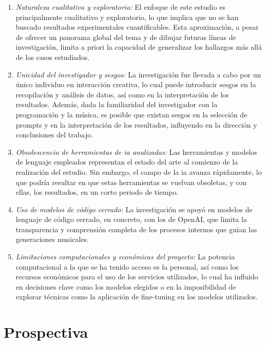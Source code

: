 \begin{enumerate}
    
\item \textit{Naturaleza cualitativa y exploratoria:} El enfoque de este estudio es principalmente cualitativo y exploratorio, lo que implica que no se han buscado resultados experimentales cuantificables. Esta aproximación, a pesar de ofrecer un panorama global del tema y de dibujar futuras líneas de investigación, limita a priori la capacidad de generalizar los hallazgos más allá de los casos estudiados.

\item \textit{Unicidad del investigador y sesgos:} La investigación fue llevada a cabo por un único individuo en interacción creativa, lo cual puede introducir sesgos en la recopilación y análisis de datos, así como en la interpretación de los resultados. Además, dada la familiaridad del investigador con la programación y la música, es posible que existan sesgos en la selección de prompts y en la interpretación de los resultados, influyendo en la dirección y conclusiones del trabajo.

\item \textit{Obsolescencia de herramientas de \gls{ia} analizadas:} Las herramientas y modelos de lenguaje empleados representan el estado del arte al comienzo de la realización del estudio. Sin embargo, el campo de la \gls{ia} avanza rápidamente, lo que podría resultar en que estas herramientas se vuelvan obsoletas, y con ellas, los resultados, en un corto periodo de tiempo.

\item \textit{Uso de modelos de código cerrado:} La investigación se apoyó en modelos de lenguaje de código cerrado, en concreto, con los de OpenAI, que limita la transparencia y comprensión completa de los procesos internos que guían las generaciones musicales.

\item \textit{Limitaciones computacionales y económicas del proyecto:} La potencia computacional a la que se ha tenido acceso es la personal, así como los recursos económicos para el uso de los servicios utilizados, lo cual ha influido en decisiones clave como los modelos elegidos o en la imposibilidad de explorar técnicas como la aplicación de fine-tuning en los modelos utilizados.
\end{enumerate}


\section{Prospectiva}


